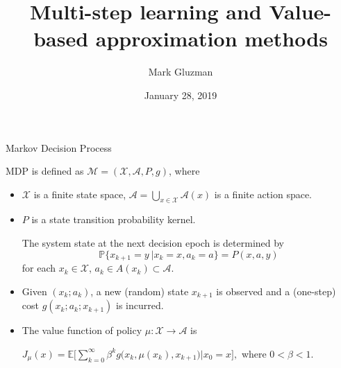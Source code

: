 \documentclass{beamer}
\title{Multi-step learning and Value-based approximation methods}
\author{Mark Gluzman}
\institute{iDDA, CUHK (Shenzhen)}
\date{January 28, 2019}
\newcommand{\Prob}{\mathbb{P}}
\def\X{{\mathcal X}}
\def\E{{\mathbb E}}
\def\A{{\mathcal A}}
\def\M{{\mathcal M}}
\begin{document}
\footnotesize



\maketitle




\begin{frame}{Markov Decision Process}



 MDP is defined as  $\M = (\X, \A, P, g)$, where
\begin{itemize}
\item  $\mathcal{X}$ is a finite state space,  $\mathcal{A} = \bigcup\limits_{x\in\X} \A(x)$ is a finite action space.


 \item  $P$ is a state transition probability kernel.


 The system state at the next decision epoch is determined by $$\Prob\Big\{x_{k+1} = y~\Big| x_k = x, a_k=a\Big\} = P(x, a,y)$$
for each $x_k\in \mathcal{X}$, $a_k\in A(x_k)\subset\mathcal{A}.$

 \item Given $(x_k; a_k)$, a new (random) state $x_{k+1}$ is observed and a (one-step) cost
$g(x_k; a_k; x_{k+1})$ is incurred.


 \item The value function of policy $\mu:\X\rightarrow \A$ is
 \begin{center}
  $
  J_\mu(x) = \E\Big[\sum\limits_{k=0}^\infty \beta^k g\big(x_k, \mu(x_k), x_{k+1}\big)| x_0 = x\Big],
$
where $0<\beta<1$. \end{center}



\end{itemize}
\end{frame}
\end{document}
